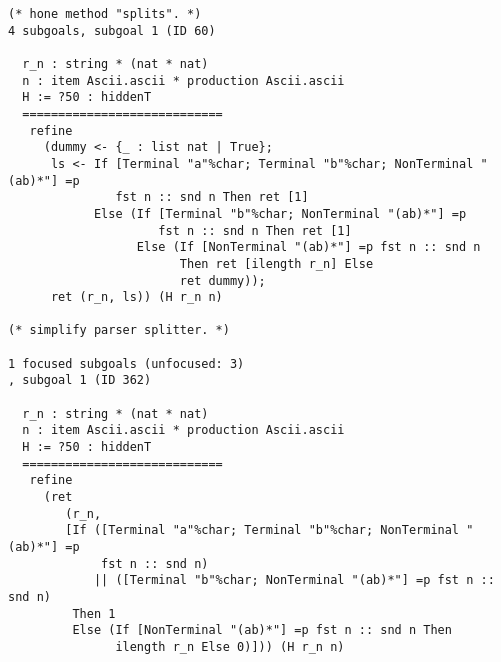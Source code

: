 \begin{verbatim}
(* hone method "splits". *)
4 subgoals, subgoal 1 (ID 60)
  
  r_n : string * (nat * nat)
  n : item Ascii.ascii * production Ascii.ascii
  H := ?50 : hiddenT
  ============================
   refine
     (dummy <- {_ : list nat | True};
      ls <- If [Terminal "a"%char; Terminal "b"%char; NonTerminal "(ab)*"] =p
               fst n :: snd n Then ret [1]
            Else (If [Terminal "b"%char; NonTerminal "(ab)*"] =p
                     fst n :: snd n Then ret [1]
                  Else (If [NonTerminal "(ab)*"] =p fst n :: snd n
                        Then ret [ilength r_n] Else 
                        ret dummy));
      ret (r_n, ls)) (H r_n n)

(* simplify parser splitter. *)

1 focused subgoals (unfocused: 3)
, subgoal 1 (ID 362)
  
  r_n : string * (nat * nat)
  n : item Ascii.ascii * production Ascii.ascii
  H := ?50 : hiddenT
  ============================
   refine
     (ret
        (r_n,
        [If ([Terminal "a"%char; Terminal "b"%char; NonTerminal "(ab)*"] =p
             fst n :: snd n)
            || ([Terminal "b"%char; NonTerminal "(ab)*"] =p fst n :: snd n)
         Then 1
         Else (If [NonTerminal "(ab)*"] =p fst n :: snd n Then 
               ilength r_n Else 0)])) (H r_n n)
\end{verbatim}



